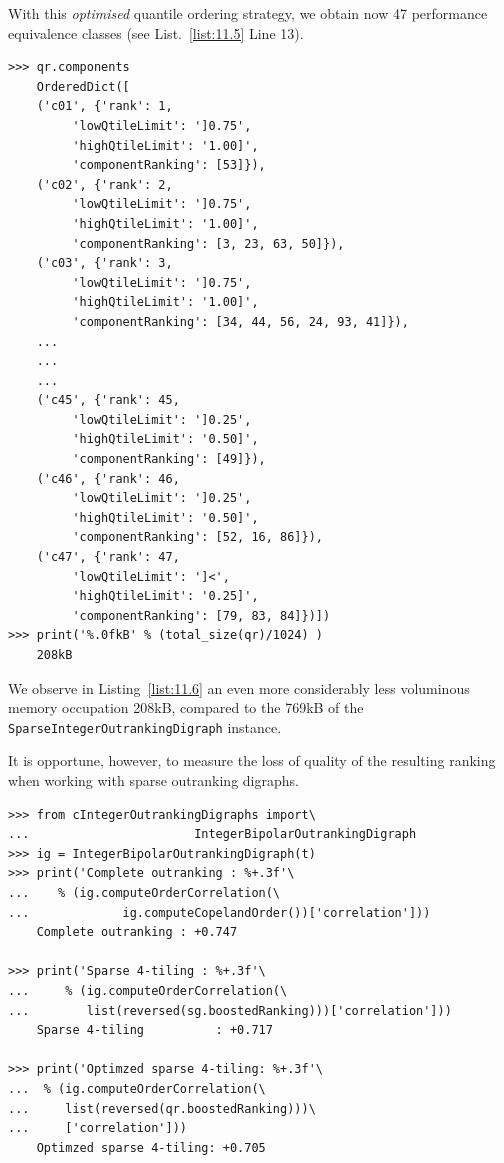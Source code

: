 With this \emph{optimised} quantile ordering strategy, we obtain now 47 performance equivalence classes (see List.~\vref{list:11.5} Line 13).
\begin{lstlisting}[caption={The ordered components of the sparse outranking digraph},label=list:11.6]
>>> qr.components
    OrderedDict([
    ('c01', {'rank': 1,
	     'lowQtileLimit': ']0.75',
	     'highQtileLimit': '1.00]',
	     'componentRanking': [53]}),
    ('c02', {'rank': 2,
	     'lowQtileLimit': ']0.75',
	     'highQtileLimit': '1.00]',
	     'componentRanking': [3, 23, 63, 50]}),
    ('c03', {'rank': 3,
	     'lowQtileLimit': ']0.75',
	     'highQtileLimit': '1.00]',
	     'componentRanking': [34, 44, 56, 24, 93, 41]}), 
    ...
    ...
    ...
    ('c45', {'rank': 45,
	     'lowQtileLimit': ']0.25',
	     'highQtileLimit': '0.50]',
	     'componentRanking': [49]}),
    ('c46', {'rank': 46,
	     'lowQtileLimit': ']0.25',
	     'highQtileLimit': '0.50]',
	     'componentRanking': [52, 16, 86]}),
    ('c47', {'rank': 47,
	     'lowQtileLimit': ']<',
	     'highQtileLimit': '0.25]',
	     'componentRanking': [79, 83, 84]})])
>>> print('%.0fkB' % (total_size(qr)/1024) )
    208kB
\end{lstlisting}

We observe in Listing~\vref{list:11.6} an even more considerably less voluminous memory occupation 208kB, compared to the 769kB of the \texttt{SparseIntegerOutran\-king\-Digraph} instance.

It is opportune, however, to measure the loss of quality of the resulting \Copeland ranking when working with sparse outranking digraphs.
\begin{lstlisting}[caption={Measuring the loss of quality with respect to the standard outranking digraph},label=list:11.7]
>>> from cIntegerOutrankingDigraphs import\
...                       IntegerBipolarOutrankingDigraph
>>> ig = IntegerBipolarOutrankingDigraph(t)
>>> print('Complete outranking : %+.3f'\
...    % (ig.computeOrderCorrelation(\
...             ig.computeCopelandOrder())['correlation']))
    Complete outranking : +0.747

>>> print('Sparse 4-tiling : %+.3f'\
...     % (ig.computeOrderCorrelation(\
...        list(reversed(sg.boostedRanking)))['correlation']))   
    Sparse 4-tiling          : +0.717

>>> print('Optimzed sparse 4-tiling: %+.3f'\
...  % (ig.computeOrderCorrelation(\
...     list(reversed(qr.boostedRanking)))\
...     ['correlation']))  
    Optimzed sparse 4-tiling: +0.705
\end{lstlisting}

